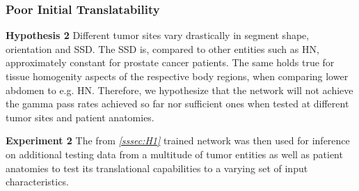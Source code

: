 \subsubsection{Poor Initial Translatability}\label{sssec:H2}
\begin{hanginglist}\itemsep2pt

    \item\textbf{Hypothesis 2}\newline
    Different tumor sites vary drastically in segment shape, orientation and \ac{SSD}. The \acs{SSD} is, compared to other entities such as \acs{HN}, approximately constant for prostate cancer patients. The same holds true for tissue homogenity aspects of the respective body regions, when comparing lower abdomen to e.g. \acs{HN}. 
    Therefore, we hypothesize that the network will not achieve the gamma pass rates achieved so far nor sufficient ones when tested at different tumor sites and patient anatomies.\\

    \item\textbf{Experiment 2}\newline
    The from \emph{\ref{sssec:H1} } trained network was then used for inference on additional testing data from a multitude of tumor entities as well as patient anatomies to test its translational capabilities to a varying set of input characteristics.\\

\end{hanginglist}


